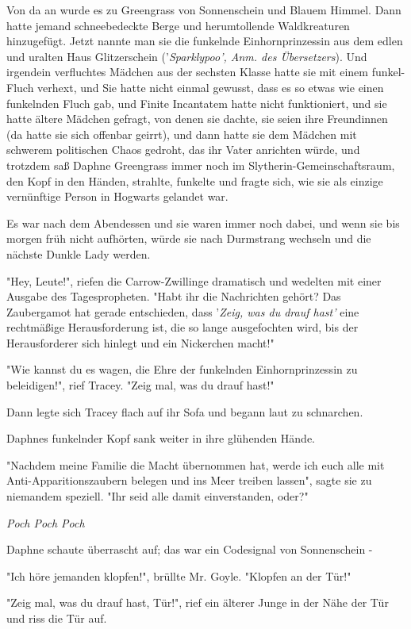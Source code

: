 {Von da an wurde es zu Greengrass von Sonnenschein und Blauem Himmel. Dann hatte jemand schneebedeckte Berge und herumtollende Waldkreaturen hinzugefügt. Jetzt nannte man sie die funkelnde Einhornprinzessin aus dem edlen und uralten Haus Glitzerschein ('\emph{Sparklypoo', Anm. des Übersetzers}). Und irgendein verfluchtes Mädchen aus der sechsten Klasse hatte sie mit einem funkel-Fluch verhext, und Sie hatte nicht einmal gewusst, dass es so etwas wie einen funkelnden Fluch gab, und Finite Incantatem hatte nicht funktioniert, und sie hatte ältere Mädchen gefragt, von denen sie dachte, sie seien ihre Freundinnen (da hatte sie sich offenbar geirrt), und dann hatte sie dem Mädchen mit schwerem politischen Chaos gedroht, das ihr Vater anrichten würde, und trotzdem saß Daphne Greengrass immer noch im Slytherin-Gemeinschaftsraum, den Kopf in den Händen, strahlte, funkelte und fragte sich, wie sie als einzige vernünftige Person in Hogwarts gelandet war.

Es war nach dem Abendessen und sie waren immer noch dabei, und wenn sie bis morgen früh nicht aufhörten, würde sie nach Durmstrang wechseln und die nächste Dunkle Lady werden.

"Hey, Leute!", riefen die Carrow-Zwillinge dramatisch und wedelten mit einer Ausgabe des Tagespropheten. "Habt ihr die Nachrichten gehört? Das Zaubergamot hat gerade entschieden, dass '\emph{Zeig, was du drauf hast'} eine rechtmäßige Herausforderung ist, die so lange ausgefochten wird, bis der Herausforderer sich hinlegt und ein Nickerchen macht!"

"Wie kannst du es wagen, die Ehre der funkelnden Einhornprinzessin zu beleidigen!", rief Tracey. "Zeig mal, was du drauf hast!"

Dann legte sich Tracey flach auf ihr Sofa und begann laut zu schnarchen.

Daphnes funkelnder Kopf sank weiter in ihre glühenden Hände.

"Nachdem meine Familie die Macht übernommen hat, werde ich euch alle mit Anti-Apparitionszaubern belegen und ins Meer treiben lassen", sagte sie zu niemandem speziell. "Ihr seid alle damit einverstanden, oder?"

\emph{Poch Poch Poch}

Daphne schaute überrascht auf; das war ein Codesignal von Sonnenschein -

"Ich höre jemanden klopfen!", brüllte Mr. Goyle. "Klopfen an der Tür!"

"Zeig mal, was du drauf hast, Tür!", rief ein älterer Junge in der Nähe der Tür und riss die Tür auf.

}
